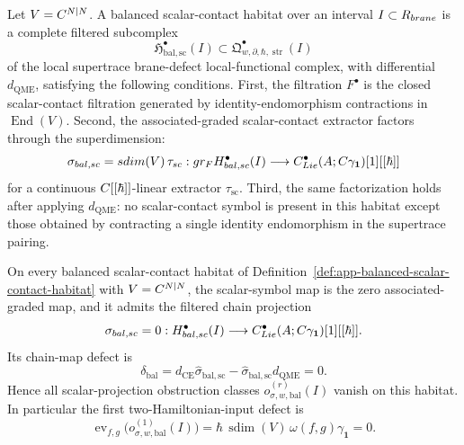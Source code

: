 \begin{defn}
\label{def:app-balanced-scalar-contact-habitat}
  Let \(V=C^{N|N}\).  A balanced scalar-contact habitat over an interval
  \(I\subset R_{brane}\) is a complete filtered subcomplex
  \[
    \mathfrak H^\bullet_{\mathrm{bal,sc}}(I)
      \subset
    \mathfrak Q^\bullet_{w,\partial,\hbar,\operatorname{str}}(I)
  \]
  of the local supertrace brane-defect local-functional complex, with
  differential \(d_{\mathrm{QME}}\), satisfying the following conditions.
  First, the filtration \(F^\bullet\) is the closed scalar-contact
  filtration generated by identity-endomorphism contractions in
  \(\operatorname{End}(V)\).  Second, the associated-graded scalar-contact
  extractor factors through the superdimension:
  \[
    \sigma_{bal,sc}
      =
    sdim(V)\,\tau_{sc}
      :
    gr_{F}H^\bullet_{bal,sc}(I)
      \longrightarrow
    C^\bullet_{Lie}(A;C\gamma_{\mathbf 1})[1][[\hbar]]
  \]
  for a continuous \(C[[\hbar]]\)-linear extractor
  \(\tau_{\mathrm{sc}}\).  Third, the same factorization holds after
  applying \(d_{\mathrm{QME}}\): no scalar-contact symbol is
  present in this habitat except those obtained by contracting a single
  identity endomorphism in the supertrace pairing.
\end{defn}

\begin{prop}
\label{prop:app-balanced-scalar-contact-projection}
  On every balanced scalar-contact habitat of
  Definition~\ref{def:app-balanced-scalar-contact-habitat} with
  \(V=C^{N|N}\), the scalar-symbol map is the zero associated-graded map,
  and it admits the filtered chain projection
  \[
    \sigma_{bal,sc}=0:
    H^\bullet_{bal,sc}(I)
      \longrightarrow
    C^\bullet_{Lie}(A;C\gamma_{\mathbf 1})[1][[\hbar]] .
  \]
  Its chain-map defect is
  \[
    \delta_{\mathrm{bal}}
      =
    d_{\mathrm{CE}}\widehat\sigma_{\mathrm{bal,sc}}
      -\widehat\sigma_{\mathrm{bal,sc}}d_{\mathrm{QME}}
      =0.
  \]
  Hence all scalar-projection obstruction classes
  \(o^{(r)}_{\sigma,w,\mathrm{bal}}(I)\) vanish on this habitat.  In
  particular the first two-Hamiltonian-input defect is
  \[
    \operatorname{ev}_{f,g}
      \bigl(o^{(1)}_{\sigma,w,\mathrm{bal}}(I)\bigr)
      =
    \hbar\,\operatorname{sdim}(V)\,
    \omega(f,g)\gamma_{\mathbf 1}
      =0 .
  \]
\end{prop}

